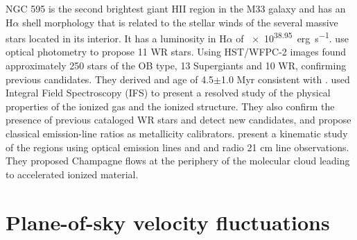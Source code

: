 \documentclass[fleqn,usenatbib, useAMS, a4paper]{mnras}
\newcommand\ha{\ensuremath{\text{H}\alpha}}
\begin{document}

NGC 595 is the second brightest giant HII region in the M33 galaxy and has an \ha{} shell morphology that is related to the stellar winds of the several massive stars located in its interior.
It has a luminosity in \ha{} of \SI{e38.95}{erg.s^{-1}}\citep{2002MNRAS.329..481B}.
\citet{1993AJ....105.1400D} use optical photometry to propose 11 WR stars. 
Using HST/WFPC-2 images \citet{1996AJ....111.1128M} found approximately 250 stars of the OB type, 13 Supergiants and 10 WR, confirming previous candidates.
They derived and age of 4.5\(\pm\)1.0 Myr consistent with \citet{1993AJ....105.1400D}.
\citet{2010MNRAS.402.1635R} used Integral Field Spectroscopy (IFS) to present a resolved study of the physical properties of the ionized gas and the ionized structure.
They also confirm the presence of previous cataloged WR stars and detect new candidates, and propose classical emission-line ratios as metallicity calibrators.
\citet{lagrois2011} present a kinematic study of the regions using optical emission lines and and radio 21 cm line observations.
They proposed Champagne flows at the periphery of the molecular cloud leading to accelerated ionized material.


\section{Plane-of-sky velocity fluctuations}\label{sec:met}
\end{document}
